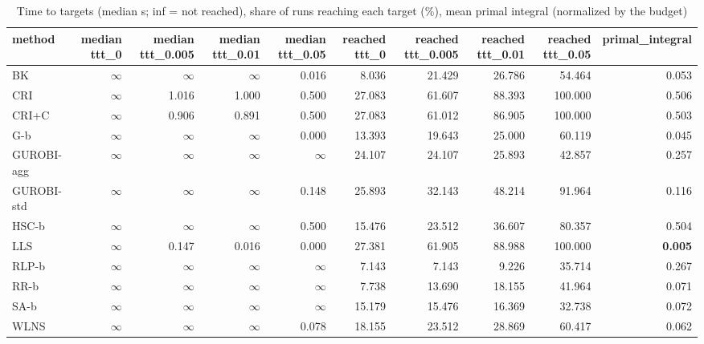 \begin{table}[htbp]
\centering
\small
\caption{Time to targets (median s; inf = not reached), share of runs reaching each target (\%), mean primal integral (normalized by the budget)}
\label{tab:E4a_equal_budgets_b1_ttt}
\begin{tabular}{lrrrrrrrrr}
\toprule
method & median ttt\_0 & median ttt\_0.005 & median ttt\_0.01 & median ttt\_0.05 & reached ttt\_0 & reached ttt\_0.005 & reached ttt\_0.01 & reached ttt\_0.05 & primal\_integral \\
\midrule
BK & $\infty$ & $\infty$ & $\infty$ & 0.016 & 8.036 & 21.429 & 26.786 & 54.464 & 0.053 \\
CRI & $\infty$ & 1.016 & 1.000 & 0.500 & 27.083 & 61.607 & 88.393 & 100.000 & 0.506 \\
CRI+C & $\infty$ & 0.906 & 0.891 & 0.500 & 27.083 & 61.012 & 86.905 & 100.000 & 0.503 \\
G-b & $\infty$ & $\infty$ & $\infty$ & 0.000 & 13.393 & 19.643 & 25.000 & 60.119 & 0.045 \\
GUROBI-agg & $\infty$ & $\infty$ & $\infty$ & $\infty$ & 24.107 & 24.107 & 25.893 & 42.857 & 0.257 \\
GUROBI-std & $\infty$ & $\infty$ & $\infty$ & 0.148 & 25.893 & 32.143 & 48.214 & 91.964 & 0.116 \\
HSC-b & $\infty$ & $\infty$ & $\infty$ & 0.500 & 15.476 & 23.512 & 36.607 & 80.357 & 0.504 \\
LLS & $\infty$ & 0.147 & 0.016 & 0.000 & 27.381 & 61.905 & 88.988 & 100.000 & \textbf{0.005} \\
RLP-b & $\infty$ & $\infty$ & $\infty$ & $\infty$ & 7.143 & 7.143 & 9.226 & 35.714 & 0.267 \\
RR-b & $\infty$ & $\infty$ & $\infty$ & $\infty$ & 7.738 & 13.690 & 18.155 & 41.964 & 0.071 \\
SA-b & $\infty$ & $\infty$ & $\infty$ & $\infty$ & 15.179 & 15.476 & 16.369 & 32.738 & 0.072 \\
WLNS & $\infty$ & $\infty$ & $\infty$ & 0.078 & 18.155 & 23.512 & 28.869 & 60.417 & 0.062 \\
\bottomrule
\end{tabular}
\end{table}
